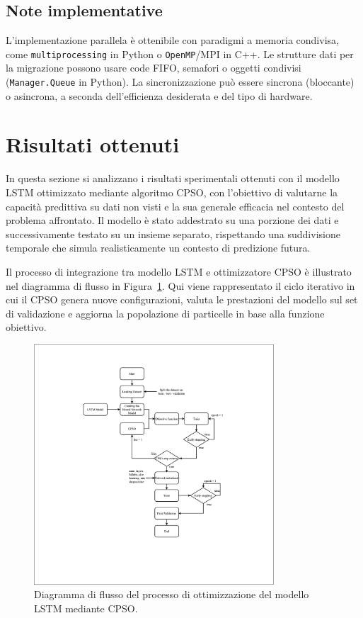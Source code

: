 \documentclass{article}
\begin{document}
\subsection{Note implementative}

L'implementazione parallela è ottenibile con paradigmi a memoria condivisa, come 
\texttt{multiprocessing} in Python o \texttt{OpenMP}/MPI in C++. Le strutture dati per la migrazione 
possono usare code FIFO, semafori o oggetti condivisi \\(\texttt{Manager.Queue} in Python). 
La sincronizzazione può essere sincrona (bloccante) o asincrona, a seconda dell’efficienza desiderata e 
del tipo di hardware.

\section{Risultati ottenuti}

In questa sezione si analizzano i risultati sperimentali ottenuti con il modello LSTM ottimizzato 
mediante algoritmo CPSO, con l’obiettivo di valutarne la capacità predittiva su dati non visti e la sua 
generale efficacia nel contesto del problema affrontato. Il modello è stato addestrato su una porzione 
dei dati e successivamente testato su un insieme separato, rispettando una suddivisione temporale che 
simula realisticamente un contesto di predizione futura.

Il processo di integrazione tra modello LSTM e ottimizzatore CPSO è illustrato nel diagramma di flusso 
in Figura~\ref{fig:cpso_flowchart}. Qui viene rappresentato il ciclo iterativo in cui il CPSO genera 
nuove configurazioni, valuta le prestazioni del modello sul set di validazione e aggiorna la popolazione 
di particelle in base alla funzione obiettivo.

\begin{figure}[H]
\centering
\includegraphics[width=0.8\textwidth]{img/LSTM-CPSO-MODEL.png}
\caption{Diagramma di flusso del processo di ottimizzazione del modello LSTM mediante CPSO.}
\label{fig:cpso_flowchart}
\end{figure}
\end{document}
